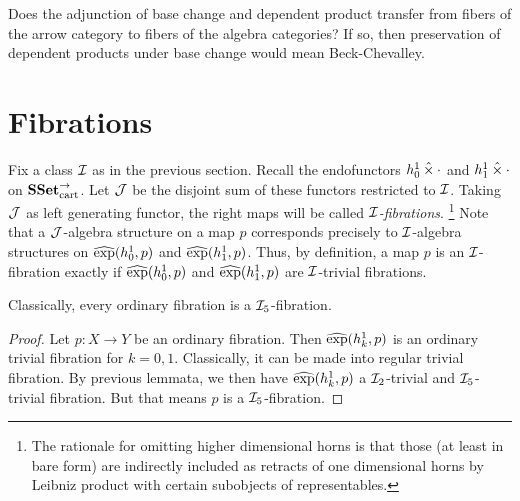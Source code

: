 \documentclass[reqno,10pt,a4paper,oneside]{amsart}
\newcommand{\SSetCart}{\SSet_{\text{cart}}^{\to}}
\begin{document}
\begin{question}
Does the adjunction of base change and dependent product transfer from fibers of the arrow category to fibers of the algebra categories?
If so, then preservation of dependent products under base change would mean Beck-Chevalley.
\end{question}

\section*{Fibrations}

Fix a class $\cal{I}$ as in the previous section.
Recall the endofunctors $h_0^1 \hattimes \arghole$ and $h_1^1 \hattimes \arghole$ on $\SSetCart$.
Let $\cal{J}$ be the disjoint sum of these functors restricted to $\cal{I}$.
Taking $\cal{J}$ as left generating functor, the right maps will be called \emph{$\cal{I}$-fibrations}.
\footnote{The rationale for omitting higher dimensional horns is that those (at least in bare form) are indirectly included as retracts of one dimensional horns by Leibniz product with certain subobjects of representables.}
Note that a $\cal{J}$-algebra structure on a map $p$ corresponds precisely to $\cal{I}$-algebra structures on $\hatexp(h_0^1, p)$ and $\hatexp(h_1^1, p)$.
Thus, by definition, a map $p$ is an $\cal{I}$-fibration exactly if $\hatexp(h_0^1, p)$ and $\hatexp(h_1^1, p)$ are $\cal{I}$-trivial fibrations.

\begin{lemma}
Classically, every ordinary fibration is a $\cal{I}_5$-fibration.
\end{lemma}

\begin{proof}
Let $p : X \to Y$ be an ordinary fibration.
Then $\hatexp(h_k^1, p)$ is an ordinary trivial fibration for $k = 0, 1$.
Classically, it can be made into regular trivial fibration.
By previous lemmata, we then have $\hatexp(h_k^1, p)$ a $\cal{I}_2$-trivial and $\cal{I}_5$-trivial fibration.
But that means $p$ is a $\cal{I}_5$-fibration.
\end{proof}
\end{document}
